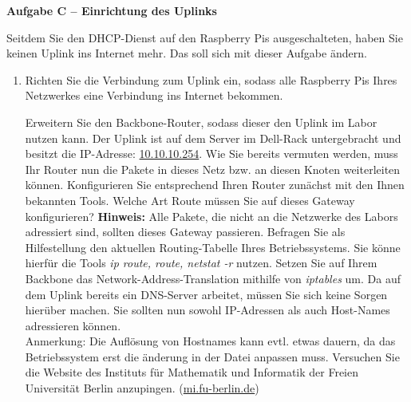 \documentclass[paper=a4,fontsize=11pt]{scrartcl}%
\numberwithin{equation}{section}
\begin{document}
\begin{center}\Large{\textbf{Aufgabe C -- Einrichtung des Uplinks}}\end{center}\vskip0.25in
Seitdem Sie den DHCP-Dienst auf den Raspberry Pis ausgeschalteten, haben Sie keinen Uplink ins Internet mehr. Das soll sich mit dieser Aufgabe ändern.
\begin{enumerate}
	\item Richten Sie die Verbindung zum Uplink ein, sodass alle Raspberry Pis Ihres Netzwerkes eine Verbindung ins Internet bekommen.
	\begin{tasks}
		\task Erweitern Sie den Backbone-Router, sodass dieser den Uplink im Labor nutzen kann. Der Uplink ist auf dem Server im Dell-Rack untergebracht und besitzt die IP-Adresse: \url{10.10.10.254}. Wie Sie bereits vermuten werden, muss Ihr Router nun die Pakete in dieses Netz bzw. an diesen Knoten weiterleiten können. Konfigurieren Sie entsprechend Ihren Router zunächst mit den Ihnen bekannten Tools.
		\task Welche Art Route müssen Sie auf dieses Gateway konfigurieren? \textbf{Hinweis:} Alle Pakete, die nicht an die Netzwerke des Labors adressiert sind, sollten dieses Gateway passieren.
  		\task Befragen Sie als Hilfestellung den aktuellen Routing-Tabelle Ihres Betriebssystems. Sie könne hierfür die Tools \emph{ip route, route, netstat -r} nutzen.
  		\task Setzen Sie auf Ihrem Backbone das Network-Address-Translation mithilfe von \emph{iptables} um.
 		\task Da auf dem Uplink bereits ein DNS-Server arbeitet, müssen Sie sich keine Sorgen hierüber machen. Sie sollten nun sowohl IP-Adressen als auch Host-Names adressieren können.\\
 		Anmerkung: Die Auflösung von Hostnames kann evtl. etwas dauern, da das Betriebssystem erst die änderung in der Datei  anpassen muss.
 		\task Versuchen Sie die Website des Instituts für Mathematik und Informatik der Freien Universität Berlin anzupingen.
 		(\url{mi.fu-berlin.de})
\end{tasks}
\end{enumerate}
\end{document}
